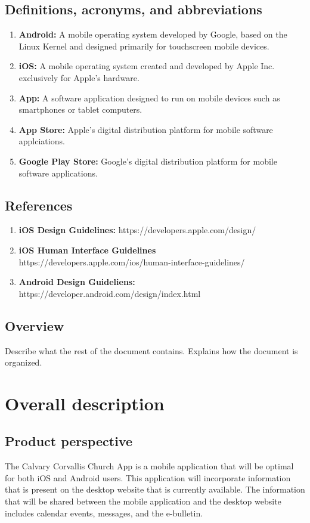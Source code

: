 \documentclass[letterpaper,10pt,draftclsnofoot,onecolumn,titlepage]{IEEEtran}
\begin{document}
	\subsection{Definitions, acronyms, and abbreviations}

	\begin{enumerate}
	\item \textbf{Android:} A mobile operating system developed by Google, based on the Linux Kernel and designed primarily for touchscreen mobile devices.
	\item \textbf{iOS:} A mobile operating system created and developed by Apple Inc. exclusively for Apple's hardware.
	\item \textbf{App:} A software application designed to run on mobile devices such as smartphones or tablet computers.
	\item \textbf{App Store:} Apple's digital distribution platform for mobile software applciations.
	\item \textbf{Google Play Store:} Google's digital distribution platform for mobile software applications.
	\end{enumerate}

	\subsection{References}
	\begin{enumerate}
	\item \textbf{iOS Design Guidelines:} https://developers.apple.com/design/
	\item \textbf{iOS Human Interface Guidelines} https://developers.apple.com/ios/human-interface-guidelines/
	\item \textbf{Android Design Guideliens:} https://developer.android.com/design/index.html
	\end{enumerate}

	\subsection{Overview}
	Describe what the rest of the document contains.
	Explains how the document is organized.

	\section{Overall description}
	\subsection{Product perspective}
	The Calvary Corvallis Church App is a mobile application that will be optimal for both iOS and Android users.
	This application will incorporate information that is present on the desktop website that is currently available.
	The information that will be shared between the mobile application and the desktop website includes calendar events, messages, and the e-bulletin.
\end{document}
